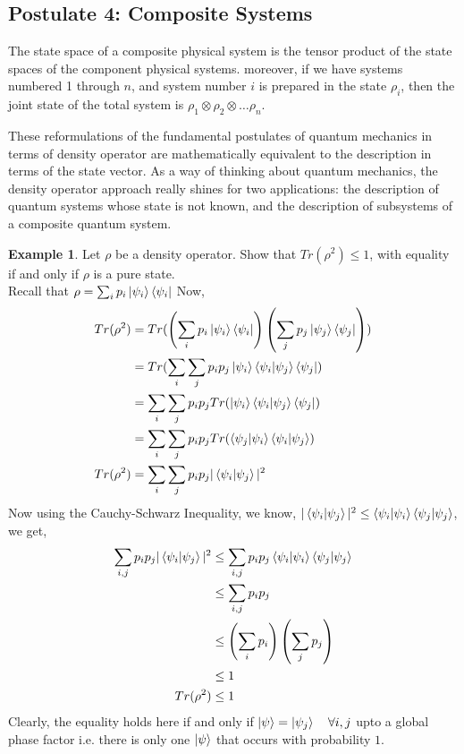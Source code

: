\documentclass[12pt, oneside]{book}
\theoremstyle{definition}
\theoremstyle{definition}
\newtheorem{example}{Example}[section]
\theoremstyle{remark}
\begin{document}
\subsection{Postulate 4: Composite Systems}
The state space of a composite physical system is the tensor product of the state spaces of the component physical systems. moreover, if we have systems numbered 1 through $n$, and system number $i$ is prepared in the state $\rho_i$, then the joint state of the total system is $\rho_1 \otimes \rho_2 \otimes \ldots \rho_n$.


These reformulations of the fundamental postulates of quantum mechanics in terms of density operator are mathematically equivalent to the description in terms of the state vector. As a way of thinking about quantum mechanics, the density operator approach really shines for two applications: the description of quantum systems whose state is not known, and the description of subsystems of a composite quantum system.

\begin{example}
    Let $\rho$ be a density operator. Show that $Tr(\rho^2)\leq 1$, with equality if and only if $\rho$ is a pure state.\\
    Recall that $\rho=\sum_ip_i\ket{\psi_i}\bra{\psi_i}$
    Now,
    \begin{align*}
    Tr(\rho^2)&=Tr(\left(\sum_ip_i \ket{\psi_i}\bra{\psi_i}\right)\left(\sum_jp_j\ket{\psi_j}\bra{\psi_j}\right))\\
    &=Tr(\sum_i\sum_jp_ip_j \ket{\psi_i}\braket{\psi_i|\psi_j}\bra{\psi_j})\\
    &=\sum_i\sum_jp_ip_jTr(\ket{\psi_i}\braket{\psi_i|\psi_j}\bra{\psi_j})\\
    &=\sum_i\sum_jp_ip_jTr(\braket{\psi_j|\psi_i}\braket{\psi_i|\psi_j})\\
    Tr(\rho^2)&=\sum_i\sum_j p_ip_j|\braket{\psi_i|\psi_j}|^2
    \end{align*}
    Now using the Cauchy-Schwarz Inequality, we know, $|\braket{\psi_i|\psi_j}|^2\leq \braket{\psi_i|\psi_i}\braket{\psi_j|\psi_j}$, we get,
    \begin{align*}
        \sum_{i,j} p_ip_j|\braket{\psi_i|\psi_j}|^2 &\leq \sum_{i,j}p_ip_j\braket{\psi_i|\psi_i}\braket{\psi_j|\psi_j}\\
        &\leq \sum_{i,j}p_ip_j\\
        &\leq \left(\sum_ip_i\right)\left(\sum_jp_j\right)\\
        &\leq 1\\
        Tr(\rho^2)&\leq 1
    \end{align*}
    Clearly, the equality holds here if and only if $\ket{\psi}=\ket{\psi_j} \quad \forall i,j$ upto a global phase factor i.e. there is only one $\ket{\psi}$ that occurs with probability $1$.
\end{example}
\end{document}
